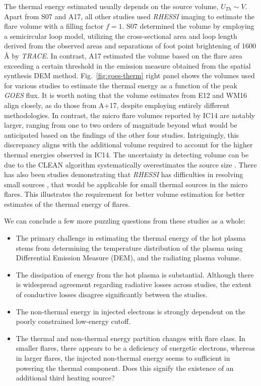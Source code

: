 The thermal energy estimated usually depends on the source volume, $U_{Th}\sim V$. Apart from S07 and A17, all other studies used {\it RHESSI} imaging to estimate the flare volume with a filling factor $f=1$. S07 determined the volume by employing a semicircular loop model, utilizing the cross-sectional area and loop length derived from the observed areas and separations of foot point brightening of 1600  {\AA} by {\it TRACE}. In contrast, A17 estimated the volume based on the flare area exceeding a certain threshold in the emission measure obtained from the spatial synthesis DEM method. Fig.~\ref{fig:goes-therm} right panel shows the volumes used for various studies to estimate the thermal energy as a function of the peak {\it GOES} flux. It is worth noting that the volume estimates from E12 and WM16 align closely, as do those from A+17, despite employing entirely different methodologies. In contrast, the micro flare volumes reported by IC14 are notably larger, ranging from one to two orders of magnitude beyond what would be anticipated based on the findings of the other four studies. Intriguingly, this discrepancy aligns with the additional volume required to account for the higher thermal energies observed in IC14. The uncertainty in detecting volume can be due to the CLEAN algorithm systematically overestimates the source size \citep{warmuth13a}. There has also been studies demonstrating that {\it RHESSI} has difficulties in resolving small sources \citep{dennis09,warmuth13b}, that would be applicable for small thermal sources in the micro flares. This illustrates the requirement for better volume estimation for better estimates of the thermal energy of flares.

We can conclude a few more puzzling questions from these studies as a whole:

\begin{itemize}
    \item The primary challenge in estimating the thermal energy of the hot plasma stems from determining the temperature distribution of the plasma using Differential Emission Measure (DEM), and the radiating plasma volume.
    \item The dissipation of energy from the hot plasma is substantial. Although there is widespread agreement regarding radiative losses across studies, the extent of conductive losses disagree significantly between the studies.
    \item The non-thermal energy in injected electrons is strongly dependent on the poorly constrained low-energy cutoff.
    \item The thermal and non-thermal energy partition changes with flare class. In smaller flares, there appears to be a deficiency of energetic electrons, whereas in larger flares, the injected non-thermal energy seems to sufficient in powering the thermal component. Does this signify the existence of an additional third heating source?
\end{itemize}


